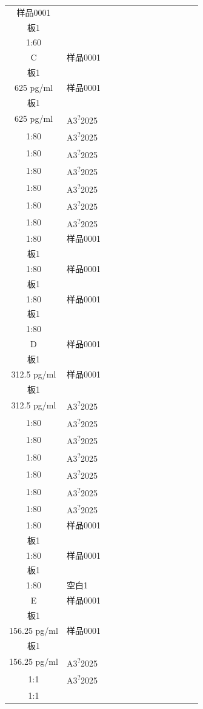 \documentclass[UTF8,10pt,a4paper,fontset=fandol]{ctexart}
\begin{document}
\begin{center}
\begin{tabular}{|c|*{12}{p{0.62cm}|}}
样品0001\\板1\\1:60
\\ \hline
C &
样品0001\\板1\\625 pg/ml &
样品0001\\板1\\625 pg/ml &
A3\textsuperscript{?}2025\\1:80 &
A3\textsuperscript{?}2025\\1:80 &
A3\textsuperscript{?}2025\\1:80 &
A3\textsuperscript{?}2025\\1:80 &
A3\textsuperscript{?}2025\\1:80 &
A3\textsuperscript{?}2025\\1:80 &
A3\textsuperscript{?}2025\\1:80 &
样品0001\\板1\\1:80 &
样品0001\\板1\\1:80 &
样品0001\\板1\\1:80
\\ \hline
D &
样品0001\\板1\\312.5 pg/ml &
样品0001\\板1\\312.5 pg/ml &
A3\textsuperscript{?}2025\\1:80 &
A3\textsuperscript{?}2025\\1:80 &
A3\textsuperscript{?}2025\\1:80 &
A3\textsuperscript{?}2025\\1:80 &
A3\textsuperscript{?}2025\\1:80 &
A3\textsuperscript{?}2025\\1:80 &
A3\textsuperscript{?}2025\\1:80 &
样品0001\\板1\\1:80 &
样品0001\\板1\\1:80 &
空白1
\\ \hline
E &
样品0001\\板1\\156.25 pg/ml &
样品0001\\板1\\156.25 pg/ml &
A3\textsuperscript{?}2025\\1:1 &
A3\textsuperscript{?}2025\\1:1 &

\end{tabular}
\end{center}
\end{document}
